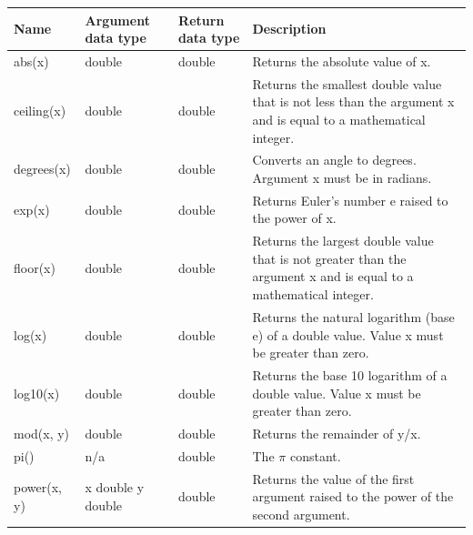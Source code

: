 \documentclass[11pt,a4paper]{ivoa}
\begin{document}
\begin{table}[thm]\footnotesize
    \begin{tabular}{|p{}|p{}|p{}|p{}|}
        \hline

        \hline
        \textbf{Name} &
        \textbf{Argument \newline data type} &
        \textbf{Return \newline data type} &
        \textbf{Description}
        \tabularnewline

        \hline
        abs(x) &
        double&double &
        Returns the absolute value of x.
        \tabularnewline

        \hline
        ceiling(x) &
        double&double &
        Returns the smallest double value that is not less than the argument x and is equal to a mathematical integer.
        \tabularnewline

        \hline
        degrees(x) &
        double &
        double &
        Converts an angle to degrees. Argument x must be in radians.
        \tabularnewline

        \hline
        exp(x) &
        double &
        double &
        Returns Euler’s number e raised to the power of x.
        \tabularnewline

        \hline
        floor(x) &
        double &
        double &
        Returns the largest double value that is not greater than the argument x and is equal to a mathematical integer.
        \tabularnewline

        \hline
        log(x) &
        double &
        double &
        Returns the natural logarithm (base e) of a double value. Value x must be greater than zero.
        \tabularnewline

        \hline
        log10(x) &
        double &
        double &
        Returns the base 10 logarithm of a double value. Value x must be greater than zero.
        \tabularnewline

        \hline
        mod(x, y) &
        double &
        double &
        Returns the remainder of y/x.
        \tabularnewline
        
        \hline
        pi() &
        n/a &
        double &
        The \(\pi\) constant.
        \tabularnewline
        
        \hline
        power(x, y) &
        x double \newline y double &
        double &
        Returns the value of the first argument raised to the power of the second argument.
        \tabularnewline


\end{tabular}
\end{table}
\end{document}
